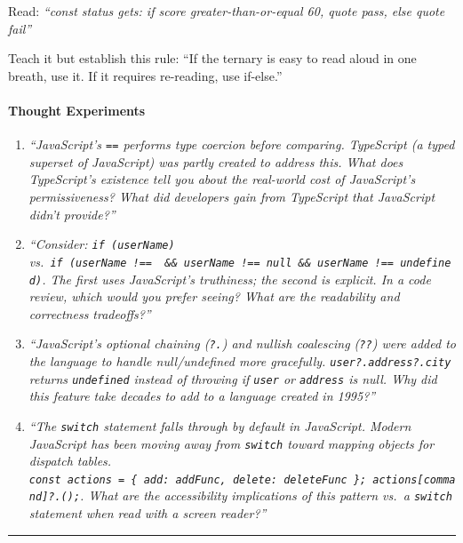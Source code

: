 \documentclass[
  justified,
  openright,
]{tufte-book}
\let\paragraph\paragraph
\let\paragraph\paragraph
\begin{document}
Read: \emph{``const status gets: if score greater-than-or-equal 60,
quote pass, else quote fail''}

Teach it but establish this rule: ``If the ternary is easy to read aloud
in one breath, use it. If it requires re-reading, use if-else.''

\paragraph{Thought Experiments}\label{thought-experiments-3}

\begin{enumerate}
\def\labelenumi{\arabic{enumi}.}
\item
  \emph{``JavaScript's \texttt{==} performs type coercion before
  comparing. TypeScript (a typed superset of JavaScript) was partly
  created to address this. What does TypeScript's existence tell you
  about the real-world cost of JavaScript's permissiveness? What did
  developers gain from TypeScript that JavaScript didn't provide?''}
\item
  \emph{``Consider: \texttt{if\ (userName)}
  vs.~\texttt{if\ (userName\ !==\ \textquotesingle{}\textquotesingle{}\ \&\&\ userName\ !==\ null\ \&\&\ userName\ !==\ undefined)}.
  The first uses JavaScript's truthiness; the second is explicit. In a
  code review, which would you prefer seeing? What are the readability
  and correctness tradeoffs?''}
\item
  \emph{``JavaScript's optional chaining (\texttt{?.}) and nullish
  coalescing (\texttt{??}) were added to the language to handle
  null/undefined more gracefully. \texttt{user?.address?.city} returns
  \texttt{undefined} instead of throwing if \texttt{user} or
  \texttt{address} is null. Why did this feature take decades to add to
  a language created in 1995?''}
\item
  \emph{``The \texttt{switch} statement falls through by default in
  JavaScript. Modern JavaScript has been moving away from
  \texttt{switch} toward mapping objects for dispatch tables.
  \texttt{const\ actions\ =\ \{\ \textquotesingle{}add\textquotesingle{}:\ addFunc,\ \textquotesingle{}delete\textquotesingle{}:\ deleteFunc\ \};\ actions{[}command{]}?.();}.
  What are the accessibility implications of this pattern vs.~a
  \texttt{switch} statement when read with a screen reader?''}
\end{enumerate}

\begin{center}\rule{0.5\linewidth}{0.5pt}\end{center}
\end{document}
